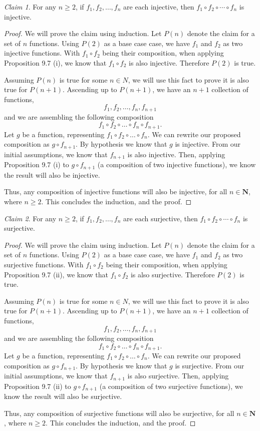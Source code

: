 \documentclass[12pt,oneside]{amsart}
\theoremstyle{remark}
\newtheorem{claim}{Claim}[exer]
\newcommand{\bfN}{\mathbf{N}}
\begin{document}
\begin{claim}
For any $n \geq 2$, if $f_1, f_2, \dotsc, f_n$ are each injective, then $f_1 \circ f_2 \circ \dotsb \circ f_n$ is injective.
\end{claim}
\begin{proof}
We will prove the claim using induction. Let $P(n)$ denote the claim for a set of $n$ functions. Using $P(2)$ as a base case case, we have $f_1$ and $f_2$ as two injective functions. With $f_1 \circ f_2$ being their composition, when applying Proposition 9.7 (i), we know that $f_1 \circ f_2$ is also injective. Therefore $P(2)$ is true.

Assuming $P(n)$ is true for some $n \in N$, we will use this fact to prove it is also true for $P(n + 1)$. Ascending up to $P(n + 1)$, we have an $n + 1$ collection of functions, \[ f_1, f_2, \dotsc, f_n, f_{n + 1} \] and we are assembling the following composition \[ f_1 \circ f_2 \circ \dotsc \circ f_n \circ f_{n + 1}. \] Let $g$ be a function, representing $f_1 \circ f_2 \circ \dotsc \circ f_n$. We can rewrite our proposed composition as $g \circ f_{n + 1}.$ By hypothesis we know that $g$ is injective. From our initial assumptions, we know that $f_{n + 1}$ is also injective. Then, applying Proposition 9.7 (i) to $g \circ f_{n + 1}$ (a composition of two injective functions), we know the result will also be injective.

Thus, any composition of injective functions will also be injective, for all $n \in \bfN$, where $n \geq 2$. This concludes the induction, and the proof.
\end{proof}

\begin{claim}
For any $n \geq 2$, if $f_1, f_2, \dotsc, f_n$ are each surjective, then $f_1 \circ f_2 \circ \dotsb \circ f_n$ is surjective.
\end{claim}
\begin{proof}
We will prove the claim using induction. Let $P(n)$ denote the claim for a set of $n$ functions. Using $P(2)$ as a base case case, we have $f_1$ and $f_2$ as two surjective functions. With $f_1 \circ f_2$ being their composition, when applying Proposition 9.7 (ii), we know that $f_1 \circ f_2$ is also surjective. Therefore $P(2)$ is true.

Assuming $P(n)$ is true for some $n \in N$, we will use this fact to prove it is also true for $P(n + 1)$. Ascending up to $P(n + 1)$, we have an $n + 1$ collection of functions, \[ f_1, f_2, \dotsc, f_n, f_{n + 1} \] and we are assembling the following composition \[ f_1 \circ f_2 \circ \dotsc \circ f_n \circ f_{n + 1}. \] Let $g$ be a function, representing $f_1 \circ f_2 \circ \dotsc \circ f_n$. We can rewrite our proposed composition as $g \circ f_{n + 1}.$ By hypothesis we know that $g$ is surjective. From our initial assumptions, we know that $f_{n + 1}$ is also surjective. Then, applying Proposition 9.7 (ii) to $g \circ f_{n + 1}$ (a composition of two surjective functions), we know the result will also be surjective.

Thus, any composition of surjective functions will also be surjective, for all $n \in \bfN$, where $n \geq 2$. This concludes the induction, and the proof.
\end{proof}
\end{document}

